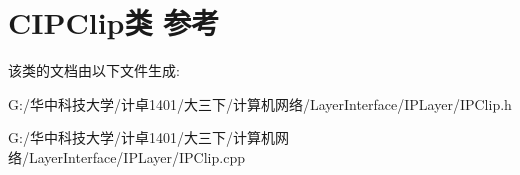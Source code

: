 \hypertarget{class_c_i_p_clip}{}\section{C\+I\+P\+Clip类 参考}
\label{class_c_i_p_clip}


该类的文档由以下文件生成\+:\begin{DoxyCompactItemize}
\item 
G\+:/华中科技大学/计卓1401/大三下/计算机网络/\+Layer\+Interface/\+I\+P\+Layer/I\+P\+Clip.\+h\item 
G\+:/华中科技大学/计卓1401/大三下/计算机网络/\+Layer\+Interface/\+I\+P\+Layer/I\+P\+Clip.\+cpp\end{DoxyCompactItemize}
